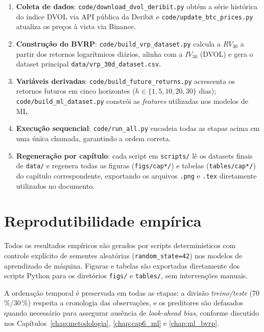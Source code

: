 \begin{enumerate}
    \item \textbf{Coleta de dados}: \texttt{code/download\_dvol\_deribit.py}
          obtém a série histórica do índice DVOL via API pública da Deribit e
          \texttt{code/update\_btc\_prices.py} atualiza os preços à vista via
          Binance.

    \item \textbf{Construção do BVRP}: \texttt{code/build\_vrp\_dataset.py}
          calcula a $RV_{30}$ a partir dos retornos logarítmicos diários,
          alinha com a $IV_{30}$ (DVOL) e gera o dataset principal
          \texttt{data/vrp\_30d\_dataset.csv}.

    \item \textbf{Variáveis derivadas}: \texttt{code/build\_future\_returns.py}
          acrescenta os retornos futuros em cinco horizontes
          ($h \in \{1, 5, 10, 20, 30\}$ dias); \texttt{code/build\_ml\_dataset.py}
          constrói as \textit{features} utilizadas nos modelos de ML.

    \item \textbf{Execução sequencial}: \texttt{code/run\_all.py} encadeia todas
          as etapas acima em uma única chamada, garantindo a ordem correta.

    \item \textbf{Regeneração por capítulo}: cada script em \texttt{scripts/}
          lê os datasets finais de \texttt{data/} e regenera todas as figuras
          (\texttt{figs/cap*/}) e tabelas (\texttt{tables/cap*/}) do capítulo
          correspondente, exportando os arquivos \texttt{.png} e \texttt{.tex}
          diretamente utilizados no documento.
\end{enumerate}

\section{Reprodutibilidade empírica}

Todos os resultados empíricos são gerados por scripts determinísticos com
controle explícito de sementes aleatórias (\texttt{random\_state=42}) nos
modelos de aprendizado de máquina. Figuras e tabelas são exportadas diretamente
dos scripts Python para os diretórios \texttt{figs/} e \texttt{tables/},
sem intervenções manuais.

A ordenação temporal é preservada em todas as etapas: a divisão
\textit{treino/teste} (70\,\%/30\,\%) respeita a cronologia das observações,
e os preditores são defasados quando necessário para assegurar ausência de
\textit{look-ahead bias}, conforme discutido nos
Capítulos~\ref{chap:metodologia}, \ref{chap:cap6_ml} e \ref{chap:ml_bvrp}.

